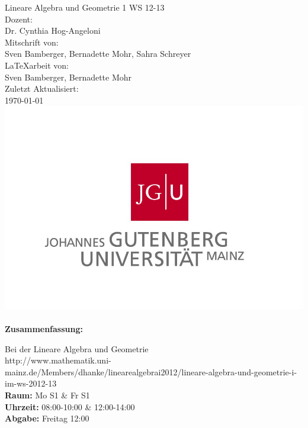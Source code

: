 \begin{titlepage}
\center
\Large Lineare Algebra und Geometrie 1 WS 12-13\large \\[2em]
Dozent:\\Dr. Cynthia Hog-Angeloni\\[2em]
Mitschrift von:\\Sven Bamberger, Bernadette Mohr, Sahra Schreyer\\[2em]
\LaTeX{arbeit} von:\\Sven Bamberger, Bernadette Mohr\\[2em]
Zuletzt Aktualisiert:\\\today\\
\includegraphics[scale=.2]{front/pics/Logo.jpg}\\\quad\\
\Large \textbf{Zusammenfassung:}\\[1em]
\parbox{0.75\textwidth}{\large
Bei der Lineare Algebra und Geometrie\\
http://www.mathematik.uni-mainz.de/Members/dhanke/linearealgebrai2012/lineare-algebra-und-geometrie-i-im-ws-2012-13\
\\
\textbf{Raum:} Mo S1 \& Fr S1\\
\textbf{Uhrzeit:} 08:00-10:00 \& 12:00-14:00\\
\textbf{Abgabe:} Freitag 12:00\\
}
\end{titlepage}
